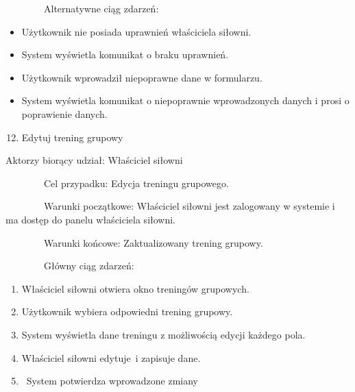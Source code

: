 \documentclass[
]{article}
\providecommand{\tightlist}{%
  \setlength{\itemsep}{0pt}\setlength{\parskip}{0pt}}
\begin{document}
{~~~~~~~~Alternatywne ciąg zdarzeń:}

\begin{itemize}
\tightlist
\item
  {Użytkownik nie posiada uprawnień właściciela siłowni.}
\end{itemize}

\begin{itemize}
\tightlist
\item
  {System wyświetla komunikat o braku uprawnień.}
\end{itemize}

\begin{itemize}
\tightlist
\item
  {Użytkownik wprowadził niepoprawne dane w formularzu.}
\end{itemize}

\begin{itemize}
\tightlist
\item
  {System wyświetla komunikat o niepoprawnie wprowadzonych danych i
  prosi o poprawienie danych.}
\end{itemize}

{}

\begin{enumerate}
\setcounter{enumi}{11}
\tightlist
\item
  {Edytuj trening grupowy}
\end{enumerate}

{Aktorzy biorący udział: Właściciel siłowni}

{~~~~~~~~Cel przypadku: Edycja treningu grupowego.}

{~~~~~~~~Warunki początkowe: Właściciel siłowni jest zalogowany w
systemie i ma dostęp do panelu właściciela siłowni.}

{~~~~~~~~Warunki końcowe: Zaktualizowany trening grupowy.}

{~~~~~~~~Główny ciąg zdarzeń:}

\begin{enumerate}
\tightlist
\item
  {Właściciel siłowni otwiera okno treningów grupowych.}
\item
  {Użytkownik wybiera odpowiedni trening grupowy.}
\item
  {System wyświetla dane treningu z możliwością edycji każdego pola.}
\item
  {Właściciel siłowni }{edytuje}{~i zapisuje dane.}
\item
  {~System potwierdza wprowadzone zmiany}
\end{enumerate}
\end{document}
